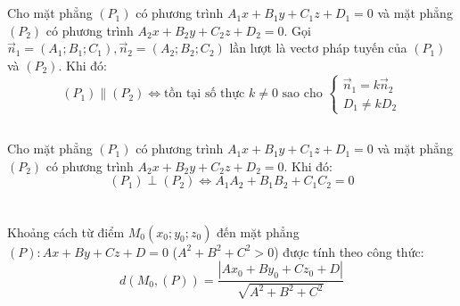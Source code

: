 \documentclass[12pt,a4paper]{extarticle}
\begin{document}
\section*{\color{myblue}{IV. Điều kiện song song, vuông góc của hai mặt phẳng}}
\subsection*{\color{myblue}{1. Điều kiện song song của hai mặt phẳng}}
\begin{tcolorbox}[colback=lightblue, colframe=myblue, arc=2mm]
Cho mặt phẳng $(P_1)$ có phương trình $A_1x + B_1y + C_1z + D_1 = 0$ và mặt phẳng $(P_2)$ có phương trình $A_2x + B_2y + C_2z + D_2 = 0$.
\vspace{0.2cm}
Gọi $\vec{n}_1 = (A_1; B_1; C_1), \vec{n}_2 = (A_2; B_2; C_2)$ lần lượt là vectơ pháp tuyến của $(P_1)$ và $(P_2)$. Khi đó:
\[
(P_1) \parallel (P_2) \iff \text{tồn tại số thực } k \neq 0 \text{ sao cho } 
\begin{cases} 
\vec{n}_1 = k\vec{n}_2 \\ 
D_1 \neq kD_2 
\end{cases}
\]
\end{tcolorbox}
\subsection*{\color{myblue}{2. Điều kiện vuông góc của hai mặt phẳng}}
\begin{tcolorbox}[colback=lightblue, colframe=myblue, arc=2mm]
Cho mặt phẳng $(P_1)$ có phương trình $A_1x + B_1y + C_1z + D_1 = 0$ và mặt phẳng $(P_2)$ có phương trình $A_2x + B_2y + C_2z + D_2 = 0$. Khi đó:
\[
(P_1) \perp (P_2) \iff A_1A_2 + B_1B_2 + C_1C_2 = 0
\]
\end{tcolorbox}
\vspace{0.4cm}
\section*{\color{myblue}{V. Khoảng cách từ một điểm đến một mặt phẳng}}
\begin{tcolorbox}[colback=lightblue, colframe=myblue, arc=2mm]
Khoảng cách từ điểm $M_0(x_0; y_0; z_0)$ đến mặt phẳng $(P): Ax + By + Cz + D = 0$ ($A^2 + B^2 + C^2 > 0$) được tính theo công thức:
\[
d(M_0, (P)) = \frac{|Ax_0 + By_0 + Cz_0 + D|}{\sqrt{A^2 + B^2 + C^2}}
\]
\end{tcolorbox}
\end{document}
